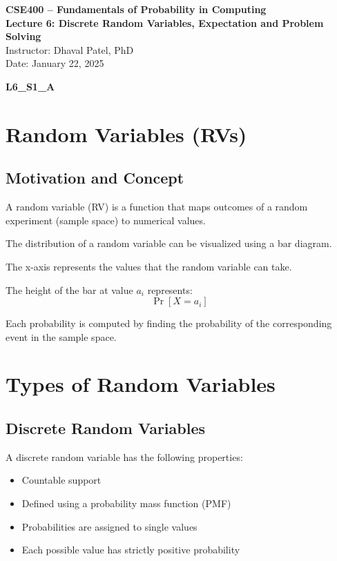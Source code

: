 \documentclass[12pt]{article}
\begin{document}
\begin{center}
\textbf{\Large CSE400 – Fundamentals of Probability in Computing} \\[4pt]
\textbf{Lecture 6: Discrete Random Variables, Expectation and Problem Solving} \\[8pt]
Instructor: Dhaval Patel, PhD \\
Date: January 22, 2025
\end{center}

\vspace{1em}

\noindent \textbf{L6\_S1\_A}

\section{Random Variables (RVs)}

\subsection{Motivation and Concept}

A random variable (RV) is a function that maps outcomes of a random experiment (sample space) to numerical values.

The distribution of a random variable can be visualized using a bar diagram.

The x-axis represents the values that the random variable can take.

The height of the bar at value $a_i$ represents:
\[
\Pr[X = a_i]
\]

Each probability is computed by finding the probability of the corresponding event in the sample space.

\section{Types of Random Variables}

\subsection{Discrete Random Variables}

A discrete random variable has the following properties:
\begin{itemize}
    \item Countable support
    \item Defined using a probability mass function (PMF)
    \item Probabilities are assigned to single values
    \item Each possible value has strictly positive probability
\end{itemize}
\end{document}

